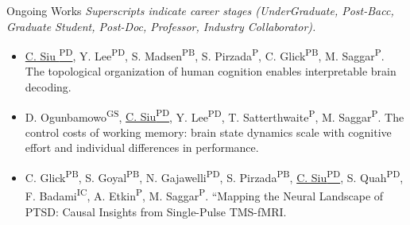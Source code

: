 \documentclass{resume} %
\begin{document}
\begin{rSection}{Ongoing Works}
\emph{Superscripts indicate career stages (UnderGraduate, Post-Bacc, Graduate Student, Post-Doc, Professor, Industry Collaborator).}
\begin{itemize}[noitemsep]
\item \underline{C. Siu {\textsuperscript{PD}}}, Y. Lee\textsuperscript{PD}, S. Madsen\textsuperscript{PB}, S. Pirzada\textsuperscript{P}, C. Glick\textsuperscript{PB}, M. Saggar\textsuperscript{P}. The topological organization of human cognition enables interpretable brain decoding.
\item D. Ogunbamowo\textsuperscript{GS}, \underline{C. Siu\textsuperscript{PD}}, Y. Lee\textsuperscript{PD}, T. Satterthwaite\textsuperscript{P}, M. Saggar\textsuperscript{P}. The control costs of working memory: brain state dynamics scale with cognitive effort and individual differences in performance.
\item C. Glick\textsuperscript{PB}, S. Goyal\textsuperscript{PB}, N. Gajawelli\textsuperscript{PD}, S. Pirzada\textsuperscript{PB}, \underline{C. Siu\textsuperscript{PD}}, S. Quah\textsuperscript{PD}, F. Badami\textsuperscript{IC}, A. Etkin\textsuperscript{P}, M. Saggar\textsuperscript{P}. “Mapping the Neural Landscape of PTSD: Causal Insights from Single-Pulse TMS-fMRI.

\end{itemize}
\end{rSection}
\end{document}
